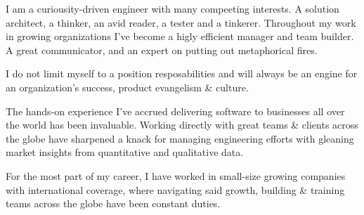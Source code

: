 I am a curiousity-driven engineer with many compeeting interests. A solution architect, a thinker, an avid reader, a tester and a tinkerer. Throughout my work in growing organizations I've become a higly efficient manager and team builder. A great communicator, and an expert on putting out metaphorical fires.

I do not limit myself to a position resposabilities and will always be an engine for an organization's success, product evangelism & culture.

The hands-on experience I've accrued delivering software to businesses all over the world has been invaluable. Working directly with great teams & clients across the globe have sharpened a knack for managing engineering efforts with gleaning market insights from quantitative and qualitative data.

For the most part of my career, I have worked in small-size growing companies with international coverage, where navigating said growth, building \& training teams across the globe have been constant duties.